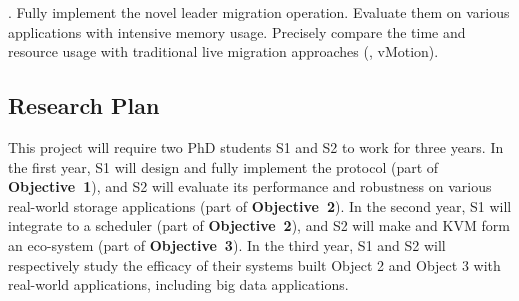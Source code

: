 . Fully implement the novel leader migration operation. 
Evaluate them on various applications with intensive memory usage. Precisely 
compare the time and resource usage with traditional live migration approaches 
(\eg, vMotion).


% 

\vspace{-.15in}\subsection{Research Plan} \label{sec:plan}\vspace{-.075in}

This project will require two PhD students S1 and S2 to work for 
three years. In the first year, S1 will design and fully implement the \falcon 
protocol (part of \textbf{Objective~1}), and S2 will evaluate its performance 
and robustness on various real-world storage applications (part of 
\textbf{Objective~2}). In the second year, S1 will 
integrate \falcon to a scheduler \mesos (part of \textbf{Objective~2}), and S2 
will make \falcon and KVM form an eco-system (part of \textbf{Objective~3}). In 
the third year, S1 and S2 will respectively study the efficacy of their systems 
built Object 2 and Object 3 with real-world applications, including big data 
applications.


